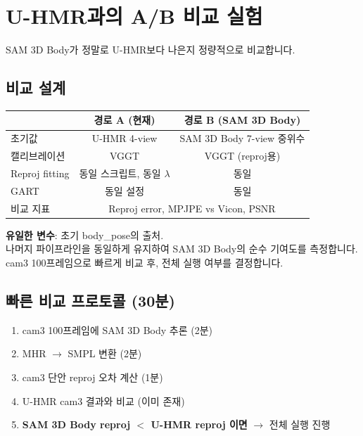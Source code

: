 \documentclass[11pt, a4paper]{report}
\begin{document}
\chapter{U-HMR과의 A/B 비교 실험}

SAM 3D Body가 정말로 U-HMR보다 나은지 정량적으로 비교합니다.

\section{비교 설계}

\begin{center}
\renewcommand{\arraystretch}{1.3}
\begin{tabular}{lcc}
\toprule
& \textbf{경로 A (현재)} & \textbf{경로 B (SAM 3D Body)} \\
\midrule
초기값 & U-HMR 4-view & SAM 3D Body 7-view 중위수 \\
캘리브레이션 & VGGT & VGGT (reproj용) \\
Reproj fitting & 동일 스크립트, 동일 $\lambda$ & 동일 \\
GART & 동일 설정 & 동일 \\
\midrule
비교 지표 & \multicolumn{2}{c}{Reproj error, MPJPE vs Vicon, PSNR} \\
\bottomrule
\end{tabular}
\end{center}

\begin{keyidea}
\textbf{유일한 변수}: 초기 body\_pose의 출처.\\
나머지 파이프라인을 동일하게 유지하여 SAM 3D Body의 순수 기여도를 측정합니다.\\
cam3 100프레임으로 빠르게 비교 후, 전체 실행 여부를 결정합니다.
\end{keyidea}

\section{빠른 비교 프로토콜 (30분)}

\begin{enumerate}
\item cam3 100프레임에 SAM 3D Body 추론 (2분)
\item MHR $\to$ SMPL 변환 (2분)
\item cam3 단안 reproj 오차 계산 (1분)
\item U-HMR cam3 결과와 비교 (이미 존재)
\item \textbf{SAM 3D Body reproj $<$ U-HMR reproj 이면} $\to$ 전체 실행 진행
\end{enumerate}
\end{document}
